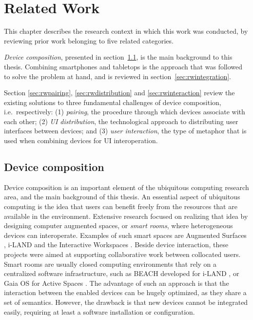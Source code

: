 \chapter{Related Work}
\label{relatedwork}

This chapter describes the research context in which this work was conducted, by reviewing prior work belonging to five related categories.

\emph{Device composition}, presented in section~\ref{sec:rwcomposition}, is the main background to this thesis.
Combining smartphones and tabletops is the approach that was followed to solve the problem at hand, and is reviewed in section~\ref{sec:rwintegration}.

Section \ref{sec:rwpairing}, \ref{sec:rwdistribution} and \ref{sec:rwinteraction} review the existing solutions to three fundamental challenges of device composition, i.e.\ respectively:
(1) \emph{pairing}, the procedure through which devices associate with each other;
(2) \emph{UI distribution}, the technological approach to distributing user interfaces between devices;
and (3) \emph{user interaction}, the type of metaphor that is used when combining devices for UI interoperation.

\section{Device composition}
\label{sec:rwcomposition}

Device composition is an important element of the ubiquitous computing research area, and the main background of this thesis.
An essential aspect of ubiquitous computing is the idea that users can benefit freely from the resources that are available in the environment.
Extensive research focused on realizing that idea by designing computer augmented spaces, or \emph{smart rooms}, where heterogeneous devices can interoperate.
Examples of such smart spaces are Augmented Surfaces \citep{Rekimoto:1999:augmentedsurfaces}, 
\mbox{i-LAND} \citep{Streitz:1999:iland} and the Interactive Workspaces \citep{Johanson:2002:iroom}.
Beside device interaction, these projects were aimed at supporting collaborative work between collocated users.
Smart rooms are usually closed computing environments that rely on a centralized software infrastructure, such as BEACH developed for i-LAND \citep{Tandler:2001:smartenv}, or Gaia OS for Active Spaces \citep{Roman:2002:gaia}.
The advantage of such an approach is that the interaction between the enabled devices can be hugely optimized, as they share a set of semantics.
However, the drawback is that new devices cannot be integrated easily, requiring at least a software installation or configuration.

